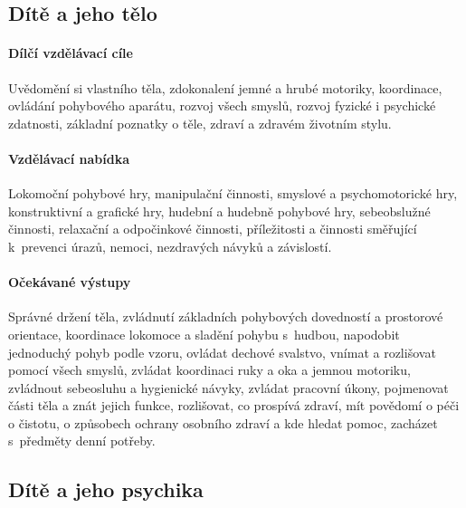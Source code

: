 			\subsection{Dítě a jeho tělo}
				\textit{} \citep[s.~16]{RVP}

				\paragraph{Dílčí vzdělávací cíle} 
					Uvědomění si vlastního těla, zdokonalení jemné a hrubé motoriky, koordinace, ovládání pohybového aparátu, rozvoj všech smyslů, rozvoj fyzické i psychické zdatnosti, základní poznatky o těle, zdraví a zdravém životním stylu.
				\paragraph{Vzdělávací nabídka}
					Lokomoční pohybové hry, manipulační činnosti, smyslové a psychomotorické hry, konstruktivní a grafické hry, hudební a hudebně pohybové hry, sebeobslužné činnosti, relaxační a odpočinkové činnosti, příležitosti a činnosti směřující k prevenci úrazů, nemoci, nezdravých návyků a závislostí.
				\paragraph{Očekávané výstupy}
					Správné držení těla, zvládnutí základních pohybových dovedností a prostorové orientace, koordinace lokomoce a sladění pohybu s hudbou, napodobit jednoduchý pohyb podle vzoru, ovládat dechové svalstvo, vnímat a rozlišovat pomocí všech smyslů, zvládat koordinaci ruky a oka a jemnou motoriku, zvládnout sebeosluhu a hygienické návyky, zvládat pracovní úkony, pojmenovat části těla a znát jejich funkce, rozlišovat, co prospívá zdraví, mít povědomí o péči o čistotu, o způsobech ochrany osobního zdraví a kde hledat pomoc, zacházet s předměty denní potřeby.

			\subsection{Dítě a jeho psychika}
				\textit{} \citep[s.~18]{RVP}

